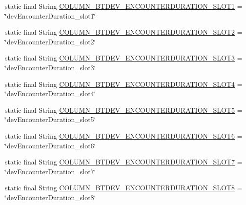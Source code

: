 \begin{DoxyCompactItemize}
\item 
static final String \hyperlink{classcom_1_1copelabs_1_1oiframework_1_1socialproximity_1_1_s_q_lite_helper_a4ef08ec127537c8cd3945d05ef9ebb5b}{C\+O\+L\+U\+M\+N\+\_\+\+B\+T\+D\+E\+V\+\_\+\+E\+N\+C\+O\+U\+N\+T\+E\+R\+D\+U\+R\+A\+T\+I\+O\+N\+\_\+\+S\+L\+O\+T1} = \char`\"{}dev\+Encounter\+Duration\+\_\+slot1\char`\"{}
\item 
static final String \hyperlink{classcom_1_1copelabs_1_1oiframework_1_1socialproximity_1_1_s_q_lite_helper_a13ed1ee3d7a8645bbd511ccb9fa1e8e1}{C\+O\+L\+U\+M\+N\+\_\+\+B\+T\+D\+E\+V\+\_\+\+E\+N\+C\+O\+U\+N\+T\+E\+R\+D\+U\+R\+A\+T\+I\+O\+N\+\_\+\+S\+L\+O\+T2} = \char`\"{}dev\+Encounter\+Duration\+\_\+slot2\char`\"{}
\item 
static final String \hyperlink{classcom_1_1copelabs_1_1oiframework_1_1socialproximity_1_1_s_q_lite_helper_a1581408605a4e12d35dd1e3977ac74a8}{C\+O\+L\+U\+M\+N\+\_\+\+B\+T\+D\+E\+V\+\_\+\+E\+N\+C\+O\+U\+N\+T\+E\+R\+D\+U\+R\+A\+T\+I\+O\+N\+\_\+\+S\+L\+O\+T3} = \char`\"{}dev\+Encounter\+Duration\+\_\+slot3\char`\"{}
\item 
static final String \hyperlink{classcom_1_1copelabs_1_1oiframework_1_1socialproximity_1_1_s_q_lite_helper_a57d2e17fbe8da0029e9c2aec589ac2a9}{C\+O\+L\+U\+M\+N\+\_\+\+B\+T\+D\+E\+V\+\_\+\+E\+N\+C\+O\+U\+N\+T\+E\+R\+D\+U\+R\+A\+T\+I\+O\+N\+\_\+\+S\+L\+O\+T4} = \char`\"{}dev\+Encounter\+Duration\+\_\+slot4\char`\"{}
\item 
static final String \hyperlink{classcom_1_1copelabs_1_1oiframework_1_1socialproximity_1_1_s_q_lite_helper_a0ec9e7d9918140c8438c33b336cf096a}{C\+O\+L\+U\+M\+N\+\_\+\+B\+T\+D\+E\+V\+\_\+\+E\+N\+C\+O\+U\+N\+T\+E\+R\+D\+U\+R\+A\+T\+I\+O\+N\+\_\+\+S\+L\+O\+T5} = \char`\"{}dev\+Encounter\+Duration\+\_\+slot5\char`\"{}
\item 
static final String \hyperlink{classcom_1_1copelabs_1_1oiframework_1_1socialproximity_1_1_s_q_lite_helper_a28b277aecd4b5af8c05909bc3228db5f}{C\+O\+L\+U\+M\+N\+\_\+\+B\+T\+D\+E\+V\+\_\+\+E\+N\+C\+O\+U\+N\+T\+E\+R\+D\+U\+R\+A\+T\+I\+O\+N\+\_\+\+S\+L\+O\+T6} = \char`\"{}dev\+Encounter\+Duration\+\_\+slot6\char`\"{}
\item 
static final String \hyperlink{classcom_1_1copelabs_1_1oiframework_1_1socialproximity_1_1_s_q_lite_helper_ac9d86b61d1797abeaf26b2a79b46953d}{C\+O\+L\+U\+M\+N\+\_\+\+B\+T\+D\+E\+V\+\_\+\+E\+N\+C\+O\+U\+N\+T\+E\+R\+D\+U\+R\+A\+T\+I\+O\+N\+\_\+\+S\+L\+O\+T7} = \char`\"{}dev\+Encounter\+Duration\+\_\+slot7\char`\"{}
\item 
static final String \hyperlink{classcom_1_1copelabs_1_1oiframework_1_1socialproximity_1_1_s_q_lite_helper_a3c3c339ebd629e17b3213ca2f68c4ebd}{C\+O\+L\+U\+M\+N\+\_\+\+B\+T\+D\+E\+V\+\_\+\+E\+N\+C\+O\+U\+N\+T\+E\+R\+D\+U\+R\+A\+T\+I\+O\+N\+\_\+\+S\+L\+O\+T8} = \char`\"{}dev\+Encounter\+Duration\+\_\+slot8\char`\"{}

\end{DoxyCompactItemize}

